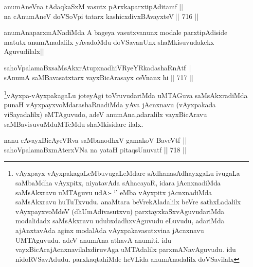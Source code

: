 \begin{shl}
anumAneVna tAdaqkaSxM vasutx pArxkaparxtipAditamf || \\
na cAnumAneV doVSoV\s pi tatarx kashicxdivxBAvayxteV ||  716 ||  
\end{shl}

\begin{artha}
anumAnaparxmANadiMda A bageya vasutxvanunx modale parxtipAdiside matutx anumAnadalilx yAvadoMdu doVSavanUnx shaMkisuvudakekx Aguvudilalx||
\end{artha}


\begin{shl}
sahoVpalamaBxsaMsAkxrAtupxnadhiVRyeYRkadashaRnAtf || \\
sA\s numA saMBavasatxtarx vayxBicArasayx ceVnanx hi ||  717 ||  
\end{shl}

\begin{artha}
\footnote{vAyxpayx vAyxpakagaLeMbuvugaLeMdare sAdhanasAdhayxgaLu ivugaLa saMbaMdha vAyxpitx, niyatavAda sAhacayaR, idara jAcnxnadiMda saMsAkxravu uMTAguvu udA:- `\stext' eMba vAyxpitx jAcnxnadiMda saMsAkxravu huTuTxvudu. anaMtara beVrekAladalilx  beVre sathxLadalilx vAyxpayxvoMdeV (dhUmAdivasutxvu) parxtayxkaSxvAguvudariMda modalidadx saMsAkxravu udubxdadhxvAguvudu eLuvudu, adariMda ajAnxtavAda aginx modalAda vAyxpakavasutxvina jAcnxnavu UMTAguvudu. adeV anumAna athavA anumiti. idu vayxBicArajAcnxnavilalxdiruvAga uMTAdalilx parxmANavAguvudu. idu nidoRVSavAdudu. parxkaqtahiMde heVLida anumAnadalilx doVSavilalx}vAyxpa-vAyxpakagaLu joteyAgi toVruvudariMda uMTAGuva saMsAkxradiMda punaH vAyxpayxvoMdarashaRnadiMda yAva jAcnxnavu (vAyxpakada viSayadalilx) eMTAguvudo, adeV anumAna,adaralilx vayxBicAravu saMBavisuvuMduMTeMdu shaMkisidare ilalx.
\end{artha}


\begin{shl}
nanu cAvayxBicAyeVRva saMbanodhxV gamakoV BaveVtf || \\
sahoVpalamaBxmAterxVNa na yataH pitaqsUnuvatf ||  718 ||  
\end{shl}


